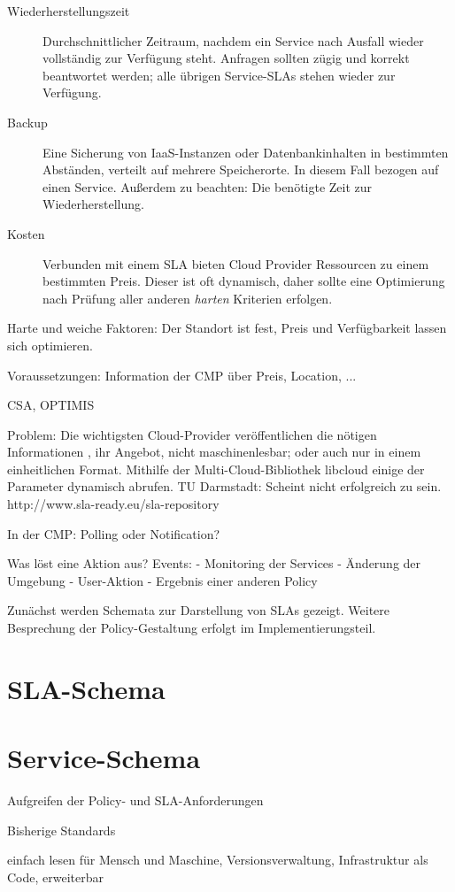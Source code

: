 \begin{description}
	\item[Wiederherstellungszeit] Durchschnittlicher Zeitraum, nachdem ein Service nach Ausfall wieder vollständig zur Verfügung steht. Anfragen sollten zügig und korrekt beantwortet werden; alle übrigen Service-SLAs stehen wieder zur Verfügung.
	
	\item[Backup] Eine Sicherung von IaaS-Instanzen oder Datenbankinhalten in bestimmten Abständen, verteilt auf mehrere Speicherorte. In diesem Fall bezogen auf einen Service. Außerdem zu beachten: Die benötigte Zeit zur Wiederherstellung.
	
	\item[Kosten] Verbunden mit einem SLA bieten Cloud Provider Ressourcen zu einem bestimmten Preis. Dieser ist oft dynamisch, daher sollte eine Optimierung nach Prüfung aller anderen \emph{harten} Kriterien erfolgen.
	 
\end{description}


Harte und weiche Faktoren: Der Standort ist fest, Preis und Verfügbarkeit lassen sich optimieren.

Voraussetzungen: Information der CMP über Preis, Location, ...

CSA, OPTIMIS

Problem: Die wichtigsten Cloud-Provider veröffentlichen die nötigen Informationen , ihr Angebot, nicht maschinenlesbar; oder auch nur in einem einheitlichen Format. Mithilfe der Multi-Cloud-Bibliothek libcloud einige der Parameter dynamisch abrufen.
TU Darmstadt: Scheint nicht erfolgreich zu sein. http://www.sla-ready.eu/sla-repository

In der CMP: Polling oder Notification?

Was löst eine Aktion aus? Events:
- Monitoring der Services
- Änderung der Umgebung
- User-Aktion
- Ergebnis einer anderen Policy


Zunächst werden Schemata zur Darstellung von SLAs gezeigt.
Weitere Besprechung der Policy-Gestaltung erfolgt im Implementierungsteil. 

\section{SLA-Schema}


\section{Service-Schema}

Aufgreifen der Policy- und SLA-Anforderungen

Bisherige Standards

einfach lesen für Mensch und Maschine, Versionsverwaltung, Infrastruktur als Code, erweiterbar
